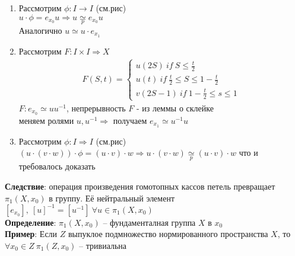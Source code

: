 	\begin{enumerate}
		\item 
			\begin{figure}[h]
			\end{figure}
			Рассмотрим $\phi: I\rightarrow I$ (см.рис)\\
			$u\cdot \phi = e_{x_0} u \Rightarrow u \underset{p}{\simeq} e_{x_0} u$\\
			Аналогично $u \simeq u\cdot e_{x_1}$
		\item 
			\begin{figure}[h]
			\end{figure}
			Рассмотрим $F: I\times I \Rightarrow X$\\
			\begin{gather*}
				F(S,t) = 
				\begin{cases}
					u(2S)\ if\ S \leq \frac{t}{2}\\
					u(t)\ if\ \frac{t}{2} \leq S \leq 1 - \frac{t}{2}\\
					v(2S-1)\ if\ 1 - \frac{t}{2} \leq s \leq 1
				\end{cases}
			\end{gather*}
			$F: e_{x_0} \simeq uu^{-1}$, непрерывность $F$ - из леммы о склейке\\
			меняем ролями $u,u^{-1} \Rightarrow$ получаем $e_{x_1} \simeq u^{-1}u$
		\item 
			\begin{figure}[h]
			\end{figure}
			Рассмотрим $\phi: I\Rightarrow I$ (см.рис)\\
			$(u\cdot (v\cdot w))\cdot \phi = (u\cdot v)\cdot w \Rightarrow u\cdot (v\cdot w) \underset{p}{\simeq} (u\cdot v)\cdot w$ что и требовалось доказать
	\end{enumerate}
	\textbf{Следствие}: операция произведения гомотопных кассов петель превращает ${\pi}_1 (X,x_0)$ в группу. Её нейтральный элемент $[e_{x_0}],\ [u]^{-1} = [u^{-1}]\ \forall u \in {\pi}_1 (X, x_0)$\\
	\textbf{Определение}: ${\pi}_1 (X,x_0) $ -- фундаменталная группа $X$ в $x_0$\\
	\textbf{Пример}: Если $Z$ выпуклое подмножество нормированного пространства $X$, то $\forall x_0 \in Z\ {\pi}_1 (Z,x_0)$ -- тривиальна
	


\newpage
